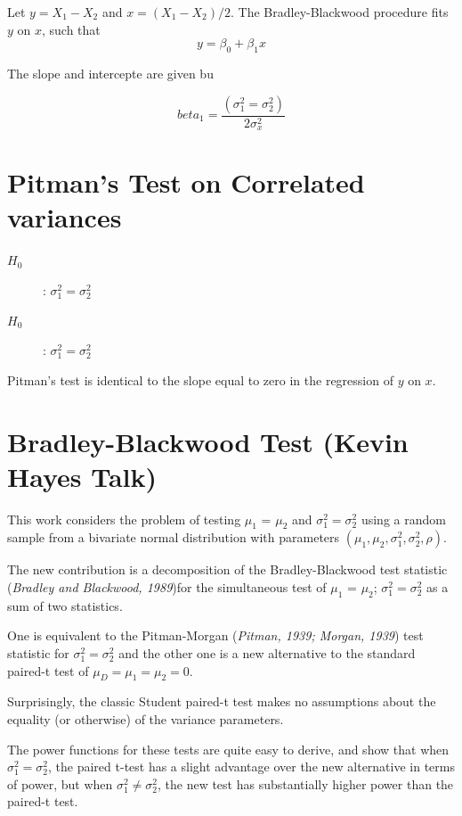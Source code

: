 \documentclass[12pt, a4paper]{report}
\theoremstyle{plain}
\theoremstyle{definition}
\theoremstyle{remark}
\begin{document}
Let $y = X_1 - X_2$ and $x= (X_1 - X_2)/2$.
The Bradley-Blackwood procedure fits $y$ on $x$, such that
\[ y = \beta_0 + \beta_1x \]

The slope and intercepte are given bu

\[beta_1 =  \frac{(\sigma^2_1 = \sigma^2_2)}{2\sigma^2_x}\]


\section*{Pitman's Test on Correlated variances}
\begin{description}
	\item[$H_0$] : $\sigma^2_1 = \sigma^2_2$
	\item[$H_0$] : $\sigma^2_1 = \sigma^2_2$
\end{description}


Pitman's test is identical to the slope equal to zero in the regression of $y$ on $x$.



\section{Bradley-Blackwood Test (Kevin Hayes Talk)}

This work considers the problem of testing $\mu_1$ = $\mu_2$ and $\sigma^2_1 = \sigma^2_2$ using a random sample from a 
bivariate normal distribution with parameters $(\mu_1, \mu_2, \sigma^2_1, \sigma^2_2, \rho)$. 

The new contribution is a decomposition of the Bradley-Blackwood test statistic (\textit{Bradley and Blackwood, 1989})for 
the simultaneous test of {$\mu_1$ = $\mu_2$; $\sigma^2_1 = \sigma^2_2$}  as a sum of two statistics. 

One is equivalent to the Pitman-Morgan (\textit{Pitman, 1939; Morgan, 1939}) test statistic 
for $\sigma^2_1 = \sigma^2_2$ and the other one is a new alternative to the standard paired-t test of $\mu_D = \mu_1 = \mu_2 = 0$. 

Surprisingly, the classic Student paired-t test makes no assumptions about the equality (or otherwise) of the 
variance parameters. 

The power functions for these tests are quite easy to derive, and show that when $\sigma^2_1 = \sigma^2_2$, 
the paired t-test has a slight advantage over the new alternative in terms of power, but when $\sigma^2_1 \neq \sigma^2_2$, the 
new test has substantially higher power than the paired-t test.
\end{document}

